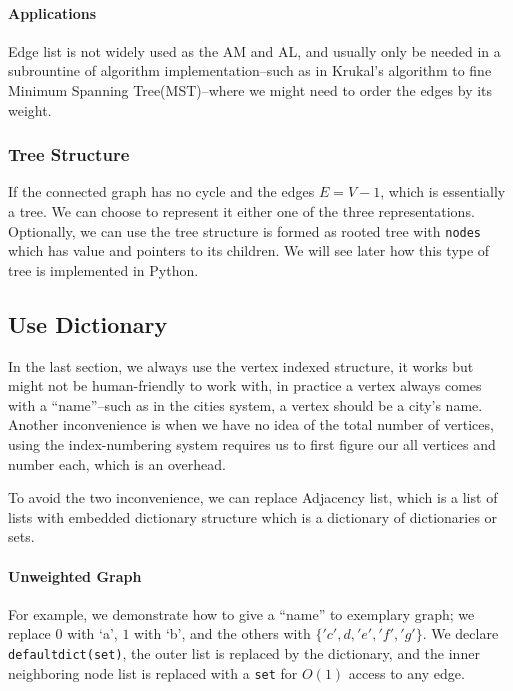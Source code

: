 \documentclass[../main.tex]{subfiles}
\begin{document}
\paragraph{Applications}
Edge list is not widely used as the AM and AL, and usually only be needed in a subrountine of algorithm implementation--such as in Krukal's algorithm to fine Minimum Spanning Tree(MST)--where we might need to order the edges by its weight. 



\subsubsection{Tree Structure}
If the connected graph has no cycle and the edges $E = V-1$, which is essentially a tree. We can choose to represent it either one of the three representations. Optionally, we can use the tree structure is formed as rooted tree with \texttt{nodes} which has value and pointers to its children. We will see later how this type of tree is implemented in Python. 

\subsection{Use Dictionary}
In the last section, we always use the vertex indexed structure, it works but might not be human-friendly to work with, in practice a vertex always comes with a ``name''--such as in the cities system, a vertex should be a city's name. Another inconvenience is when we have no idea of the total number of vertices, using the index-numbering system requires us to first figure our all vertices and number each, which is an overhead. 

To avoid the two inconvenience, we can replace Adjacency list, which is a list of lists with embedded dictionary structure which is a dictionary of dictionaries or sets.   
\paragraph{Unweighted Graph}For example, we demonstrate how to give a ``name'' to exemplary graph; we replace $0$ with `a', $1$ with `b', and the others with $\{'c', d, 'e', 'f', 'g'\}$. We declare \texttt{ defaultdict(set)}, the outer list is replaced by the dictionary, and the inner neighboring node list is replaced with a \texttt{set} for $O(1)$ access to any edge.  
\end{document}
